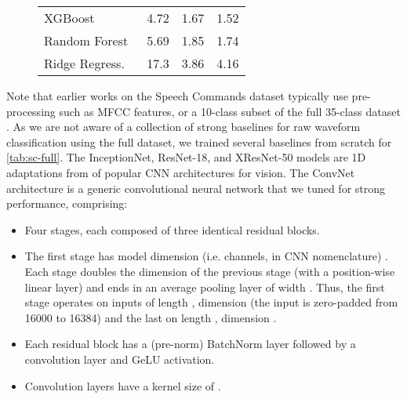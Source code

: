 \documentclass{article}
\begin{document}
\begin{figure}[!t]
\begin{minipage}[t]{0.65\linewidth}
\begin{tabular}{@{}llll@{}}
      XGBoost~\citep{Tan2020TSER}        & 4.72                      & 1.67                      & 1.52                      \\
      Random Forest~\citep{Tan2020TSER}  & 5.69                      & 1.85                      & 1.74                      \\
      Ridge Regress.~\citep{Tan2020TSER} & 17.3                      & 3.86                      & 4.16                      \\
      \bottomrule
    \end{tabular}
    \label{tab:bidmc-full}
\end{minipage}
\end{figure}

Note that earlier works on the Speech Commands dataset typically use pre-processing such as MFCC features, or a 10-class subset of the full 35-class dataset \citep{kidger2020neural,romero2021ckconv,gu2022efficiently}.
As we are not aware of a collection of strong baselines for raw waveform classification using the full dataset, we trained several baselines from scratch for \cref{tab:sc-full}.
The InceptionNet, ResNet-18, and XResNet-50 models are 1D adaptations from \citet{nonaka2021depth} of popular CNN architectures for vision.
The ConvNet architecture is a generic convolutional neural network that we tuned for strong performance, comprising:
\begin{itemize}\item Four stages, each composed of three identical residual blocks.
  \item The first stage has model dimension (i.e. channels, in CNN nomenclature) . Each stage doubles the dimension of the previous stage (with a position-wise linear layer) and ends in an average pooling layer of width . Thus, the first stage operates on inputs of length , dimension  (the input is zero-padded from 16000 to 16384) and the last on length , dimension .
  \item Each residual block has a (pre-norm) BatchNorm layer followed by a convolution layer and GeLU activation.
  \item Convolution layers have a kernel size of .
\end{itemize}
\end{document}
